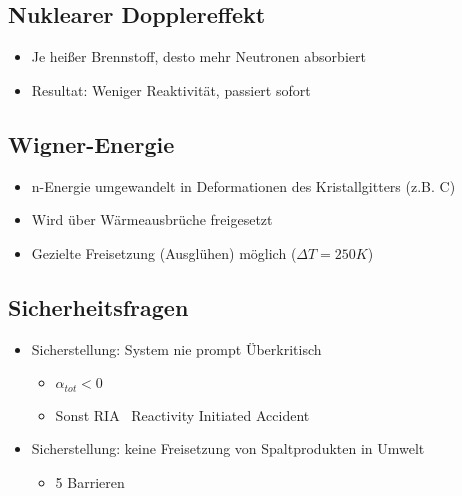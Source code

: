 \documentclass[12pt]{article}
\begin{document}
\subsection{Nuklearer Dopplereffekt}
\begin{itemize}[noitemsep]
	\item Je heißer Brennstoff, desto mehr Neutronen absorbiert
	\item Resultat: Weniger Reaktivität, passiert sofort
\end{itemize}

\subsection{Wigner-Energie}
\begin{itemize}[noitemsep]
	\item n-Energie umgewandelt in Deformationen des Kristallgitters (z.B. C)
	\item Wird über Wärmeausbrüche freigesetzt
	\item Gezielte Freisetzung (Ausglühen) möglich (\(\Delta T = 250K\))
\end{itemize}

\subsection{Sicherheitsfragen}
\begin{itemize}[noitemsep]
	\item Sicherstellung: System nie prompt Überkritisch
		\begin{itemize}[noitemsep]
			\item \(\alpha_{tot} < 0\)
			\item Sonst RIA \textrightarrow\ Reactivity Initiated Accident
		\end{itemize}
	\item Sicherstellung: keine Freisetzung von Spaltprodukten in Umwelt
		\begin{itemize}[noitemsep]
			\item 5 Barrieren
		\end{itemize}
\end{itemize}
\end{document}
